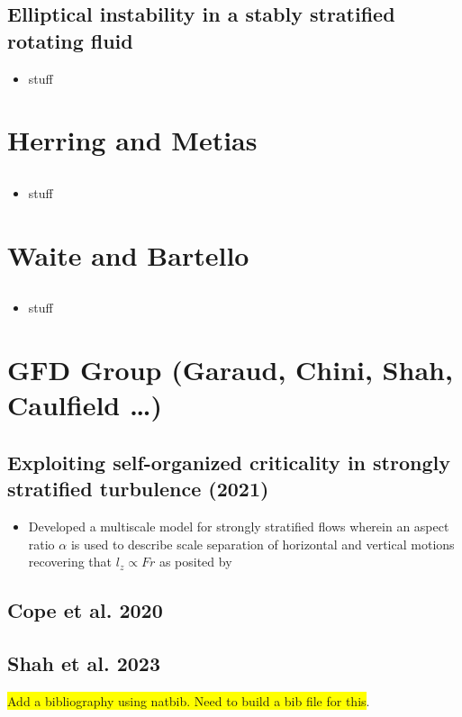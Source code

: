 \documentclass{article}
\begin{document}
\subsection{Elliptical instability in a stably stratified rotating fluid}
\begin{itemize}
   \item stuff 
\end{itemize}


\section{Herring and Metias}

\subsection{}
\begin{itemize}
    \item stuff
\end{itemize}

\section{Waite and Bartello}
\subsection{}
\begin{itemize}
    \item stuff
\end{itemize}


\section{GFD Group (Garaud, Chini, Shah, Caulfield \ldots)}

\subsection{Exploiting self-organized criticality in strongly stratified
turbulence (2021)}
\begin{itemize}
    \item Developed a multiscale model for strongly stratified flows wherein an
    aspect ratio $\alpha$ is used to describe scale separation of horizontal and
    vertical motions recovering that $l_z \propto Fr$ as posited by
\end{itemize}

\subsection{Cope et al. 2020}

\subsection{Shah et al. 2023}

\colorbox{yellow}{Add a bibliography using natbib. Need to build a bib file for this}. 
\end{document}
